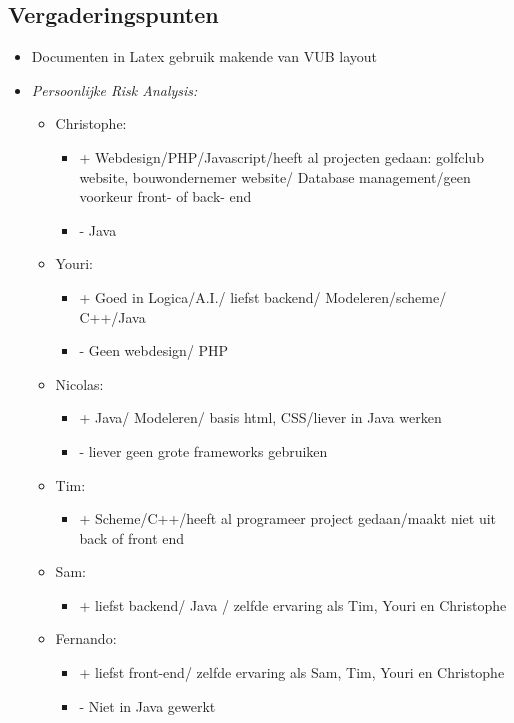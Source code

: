 \subsection{Vergaderingspunten}
\begin{itemize}
	\item Documenten in Latex gebruik makende van VUB layout
	\item \textit{Persoonlijke Risk Analysis:}
		\begin{itemize}	
			\item Christophe: 
			 \begin{itemize}
			 	\item + Webdesign/PHP/Javascript/heeft al projecten gedaan: golfclub website, bouwondernemer website/ Database management/geen voorkeur front- of back- end
			 	\item - Java
			 \end{itemize} 		 
			 \item Youri:
			 \begin{itemize}
			 	\item + Goed in Logica/A.I./ liefst backend/ Modeleren/scheme/ C++/Java
			 	\item - Geen webdesign/ PHP
			 \end{itemize}		 
			 \item Nicolas:
			 \begin{itemize}
			 	\item + Java/ Modeleren/ basis html, CSS/liever in Java werken
			 	\item - liever geen grote frameworks gebruiken
			 \end{itemize}		 
			 \item Tim:
			 \begin{itemize}
			 	\item + Scheme/C++/heeft al programeer project gedaan/maakt niet uit back of front end
			 \end{itemize}		 
			 \item Sam:
			 \begin{itemize}
			 	\item + liefst backend/ Java / zelfde ervaring als Tim, Youri en Christophe
			 \end{itemize}		 
			 \item Fernando:
			 \begin{itemize}
			 	\item + liefst front-end/ zelfde ervaring als Sam, Tim, Youri en Christophe
			 	\item - Niet in Java gewerkt

\end{itemize}
\end{itemize}
\end{itemize}
